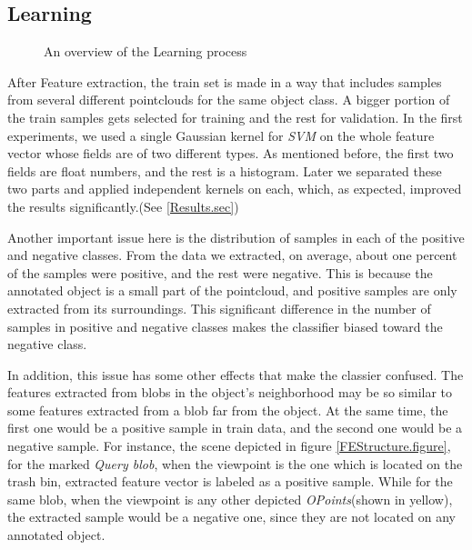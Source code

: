 
\subsection{Learning}
\label{Learning.ssec}

\begin{figure}[t]
  \caption[Learning Overview Flowchart]
  {An overview of the Learning process}
  \label{LearningFlowchart.figure}
\end{figure}

After Feature extraction, the train set is made in a way that includes samples from several different pointclouds for the same object class. A bigger portion of the train samples gets selected for training and the rest for validation. In the first experiments, we used a single Gaussian kernel for {\it SVM} on the whole feature vector whose fields are of two different types. As mentioned before, the first two fields are float numbers, and the rest is a histogram. Later we separated these two parts and applied independent kernels on each, which, as expected, improved the results significantly.(See \ref{Results.sec}) 


Another important issue here is the distribution of samples in each of the positive and negative classes. From the data we extracted, on average, about one percent of the samples were positive, and the rest were negative. This is because the annotated object is a small part of the pointcloud, and positive samples are only extracted from its surroundings. This significant difference in the number of samples in positive and negative classes makes the classifier biased toward the negative class. 


In addition, this issue has some other effects that make the classier confused. The features extracted from blobs in the object's neighborhood may be so similar to some features extracted from a blob far from the object. At the same time, the first one would be a positive sample in train data, and the second one would be a negative sample. For instance, the scene depicted in figure \ref{FEStructure.figure}, for the marked {\it Query blob}, when the viewpoint is the one which is located on the trash bin, extracted feature vector is labeled as a positive sample. While for the same blob, when the viewpoint is any other depicted {\it OPoints}(shown in yellow), the extracted sample would be a negative one, since they are not located on any annotated object. 


